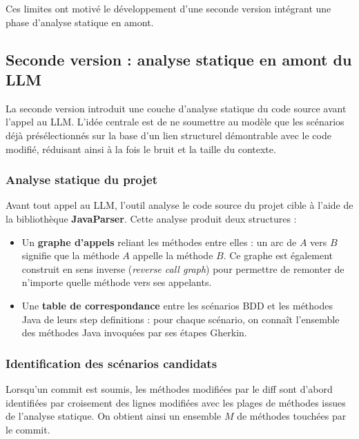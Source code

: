 \documentclass[12pt,a4paper]{article}
\begin{document}
Ces limites ont motivé le développement d'une seconde version intégrant
une phase d'analyse statique en amont.

\subsection{Seconde version : analyse statique en amont du LLM}

La seconde version introduit une couche d'analyse statique du code source
avant l'appel au LLM. L'idée centrale est de ne soumettre au modèle que
les scénarios déjà présélectionnés sur la base d'un lien structurel
démontrable avec le code modifié, réduisant ainsi à la fois le bruit et
la taille du contexte.

\subsubsection{Analyse statique du projet}

Avant tout appel au LLM, l'outil analyse le code source du projet cible
à l'aide de la bibliothèque \textbf{JavaParser}. Cette analyse produit
deux structures :

\begin{itemize}
  \item Un \textbf{graphe d'appels} reliant les méthodes entre elles :
        un arc de $A$ vers $B$ signifie que la méthode $A$ appelle la
        méthode $B$. Ce graphe est également construit en sens inverse
        (\emph{reverse call graph}) pour permettre de remonter de
        n'importe quelle méthode vers ses appelants.

  \item Une \textbf{table de correspondance} entre les scénarios BDD et
        les méthodes Java de leurs step definitions : pour chaque scénario,
        on connaît l'ensemble des méthodes Java invoquées par ses étapes
        Gherkin.
\end{itemize}

\subsubsection{Identification des scénarios candidats}

Lorsqu'un commit est soumis, les méthodes modifiées par le diff sont
d'abord identifiées par croisement des lignes modifiées avec les plages
de méthodes issues de l'analyse statique. On obtient ainsi un ensemble
$M$ de méthodes touchées par le commit.
\end{document}
